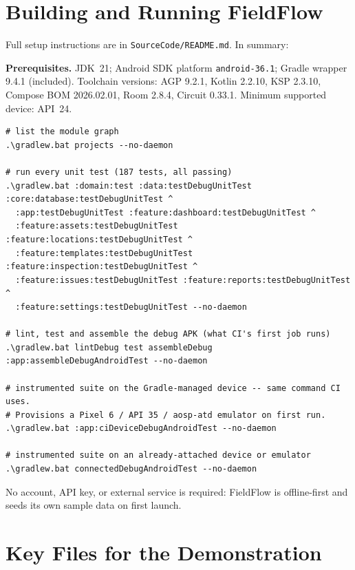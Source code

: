 \documentclass[11pt,a4paper]{article}
\newcommand{\file}[1]{{\small\texttt{#1}}}
\begin{document}
\appendix
\section{Building and Running FieldFlow}

Full setup instructions are in \file{SourceCode/README.md}. In summary:

\textbf{Prerequisites.} JDK~21; Android SDK platform \texttt{android-36.1};
Gradle wrapper 9.4.1 (included). Toolchain versions: AGP 9.2.1, Kotlin 2.2.10,
KSP 2.3.10, Compose BOM 2026.02.01, Room 2.8.4, Circuit 0.33.1. Minimum
supported device: API~24.

\begin{lstlisting}[language={},caption={Build and verification commands (PowerShell).}]
# list the module graph
.\gradlew.bat projects --no-daemon

# run every unit test (187 tests, all passing)
.\gradlew.bat :domain:test :data:testDebugUnitTest :core:database:testDebugUnitTest ^
  :app:testDebugUnitTest :feature:dashboard:testDebugUnitTest ^
  :feature:assets:testDebugUnitTest :feature:locations:testDebugUnitTest ^
  :feature:templates:testDebugUnitTest :feature:inspection:testDebugUnitTest ^
  :feature:issues:testDebugUnitTest :feature:reports:testDebugUnitTest ^
  :feature:settings:testDebugUnitTest --no-daemon

# lint, test and assemble the debug APK (what CI's first job runs)
.\gradlew.bat lintDebug test assembleDebug :app:assembleDebugAndroidTest --no-daemon

# instrumented suite on the Gradle-managed device -- same command CI uses.
# Provisions a Pixel 6 / API 35 / aosp-atd emulator on first run.
.\gradlew.bat :app:ciDeviceDebugAndroidTest --no-daemon

# instrumented suite on an already-attached device or emulator
.\gradlew.bat connectedDebugAndroidTest --no-daemon
\end{lstlisting}

No account, API key, or external service is required: FieldFlow is offline-first
and seeds its own sample data on first launch.

\section{Key Files for the Demonstration}
\end{document}
